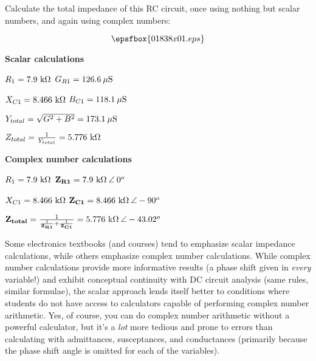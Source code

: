 

Calculate the total impedance of this RC circuit, once using nothing but scalar numbers, and again using complex numbers:

$$\epsfbox{01838x01.eps}$$







\noindent
{\bf Scalar calculations}

$R_1 = 7.9 \hbox{ k}\Omega$ \hskip 10pt $G_{R1} = 126.6 \> \mu \hbox{S}$

$X_{C1} = 8.466 \hbox{ k}\Omega$ \hskip 10pt $B_{C1} = 118.1 \> \mu \hbox{S}$

$Y_{total} = \sqrt{G^2 + B^2} = 173.1 \> \mu \hbox{S}$

$Z_{total} = {1 \over Y_{total}} = 5.776 \hbox{ k}\Omega$

\vskip 10pt

\goodbreak

\noindent
{\bf Complex number calculations}

$R_1 = 7.9 \hbox{ k}\Omega$ \hskip 10pt ${\bf Z_{R1}} = 7.9 \hbox{ k}\Omega \> \angle \> 0^o$

$X_{C1} = 8.466 \hbox{ k}\Omega$ \hskip 10pt ${\bf Z_{C1}} = 8.466 \hbox{ k}\Omega \> \angle -90^o$

${\bf Z_{total}} = { 1 \over {{1 \over {\bf Z_{R1}}} + {1 \over {\bf Z_{C1}}}}} = 5.776 \hbox{ k}\Omega \> \angle -43.02^o$







Some electronics textbooks (and courses) tend to emphasize scalar impedance calculations, while others emphasize complex number calculations.  While complex number calculations provide more informative results (a phase shift given in {\it every} variable!) and exhibit conceptual continuity with DC circuit analysis (same rules, similar formulae), the scalar approach lends itself better to conditions where students do not have access to calculators capable of performing complex number arithmetic.  Yes, of course, you can do complex number arithmetic without a powerful calculator, but it's a {\it lot} more tedious and prone to errors than calculating with admittances, susceptances, and conductances (primarily because the phase shift angle is omitted for each of the variables).




